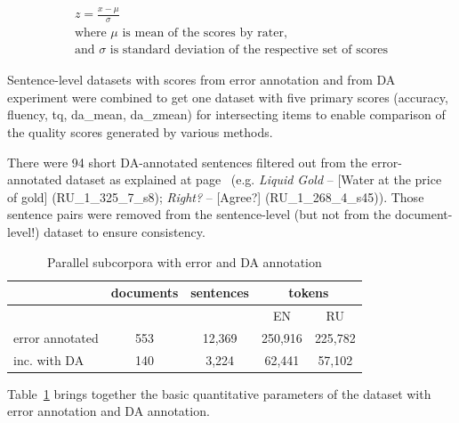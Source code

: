 
\begin{equation}\label{eq:zscore}
\begin{split}
z = \frac{x - \mu}{\sigma} \\
\text{where $\mu$ is mean of the scores by rater,} \\
\text{and $\sigma$ is standard deviation of the respective set of scores}
\end{split}
\end{equation}

Sentence-level datasets with scores from error annotation and from DA experiment were combined to get one dataset with five primary scores (accuracy, fluency, tq, da\_mean, da\_zmean) for intersecting items to enable comparison of the quality scores generated by various methods. 

There were 94 short DA-annotated sentences filtered out from the error-annotated dataset as explained at page~\pageref{pg:shorts_filtered_out} (e.g. \textit{Liquid Gold} --  [Water at the price of gold] (RU\_1\_325\_7\_s8); \textit{Right?} --  [Agree?] (RU\_1\_268\_4\_s45)).
Those sentence pairs were removed from the sentence-level (but not from the document-level!) dataset to ensure consistency.
\begin{table}[H]
	\centering
	\begin{tabular}{l|c|c|cc}
		\toprule
		
		& documents & sentences & \multicolumn{2}{c}{tokens} \\
		\midrule
		&      &        & EN      &  RU \\
		error annotated & 553  & 12,369 & 250,916 & 225,782 \\
		\hspace{1em} inc. with DA & 140  & 3,224 & 62,441 & 57,102 \\
		\bottomrule
	\end{tabular}
	\caption{\label{tab:sent_err_da} Parallel subcorpora with error and DA annotation}
\end{table}

\vspace*{-1em}
Table~\ref{tab:sent_err_da} brings together the basic quantitative parameters of the dataset with error annotation and DA annotation.

